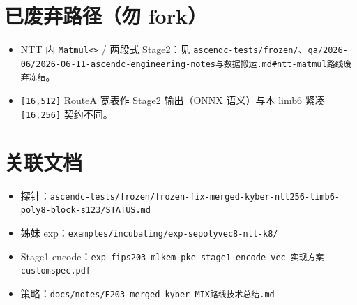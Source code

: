 \documentclass[UTF8,a4paper,11pt]{ctexart}
\begin{document}
\section{已废弃路径（勿 fork）}

\begin{itemize}
  \item NTT 内 \texttt{Matmul<>} / 两段式 Stage2：见 \texttt{ascendc-tests/frozen/}、\texttt{qa/2026-06/2026-06-11-ascendc-engineering-notes与数据搬运.md\#ntt-matmul路线废弃冻结}。
  \item \texttt{[16,512]} RouteA 宽表作 Stage2 输出（ONNX 语义）与本 limb6 紧凑 \texttt{[16,256]} 契约不同。
\end{itemize}

\section{关联文档}

\begin{itemize}
  \item 探针：\texttt{ascendc-tests/frozen/frozen-fix-merged-kyber-ntt256-limb6-poly8-block-s123/STATUS.md}
  \item 姊妹 exp：\texttt{examples/incubating/exp-sepolyvec8-ntt-k8/}
  \item Stage1 encode：\texttt{exp-fips203-mlkem-pke-stage1-encode-vec-实现方案-customspec.pdf}
  \item 策略：\texttt{docs/notes/F203-merged-kyber-MIX路线技术总结.md}
\end{itemize}
\end{document}
